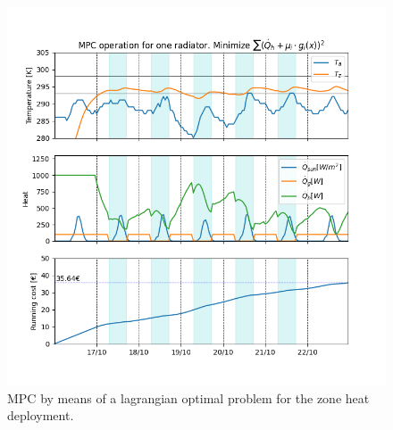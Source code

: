\begin{figure}[H]
\centering
\includegraphics[scale=0.8]{images/mpc_lagrangian_Tstart.png}
\caption{MPC by means of a lagrangian optimal problem for the zone heat deployment.}
\label{fig:mpc_lagrangian_Tstart}
\end{figure}